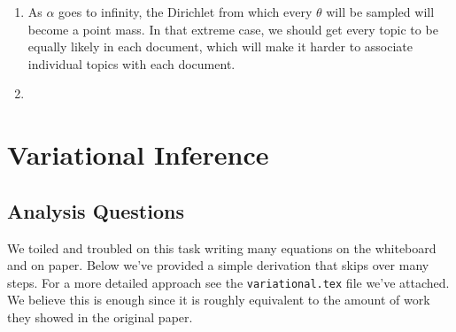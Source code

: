 \documentclass[11pt,a4paper]{article}
\begin{document}
\begin{enumerate}
\begin{enumerate}
			\item As $\alpha$ goes to infinity, the Dirichlet from which every $\theta$ 
			will be sampled will become a point mass.
			In that extreme case, we should get
			every topic to be equally likely in each document, which will make it
			harder to associate individual topics with each document.
			\item 
		\end{enumerate}
	\end{enumerate}
	
	\section{Variational Inference}
	\subsection{Analysis Questions}
	
	We toiled and troubled on this task writing many equations on the whiteboard and on paper. Below we've provided a simple derivation that skips over many steps. For a more detailed approach see the \texttt{variational.tex} file we've attached. We believe this is enough since it is roughly equivalent to the amount of work they showed in the original paper.
\\ \\
\end{document}
